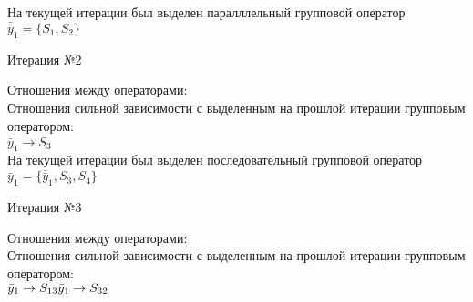 \documentclass[a4paper,14pt]{article}
\begin{document}
%
На текущей итерации был выделен паралллельный групповой оператор $\bar{\bar{y}}_{1} = \{S_{1}, S_{2}\}$
\begin{center} Итерация №2 \end{center}
Отношения между операторами: \\
Отношения сильной зависимости с выделенным на прошлой итерации групповым оператором: \\ \newline
\begin{math}
    \bar{\bar{y}}_{1} \rightarrow S_{3}
\end{math}\\ \newline
%
На текущей итерации был выделен последовательный групповой оператор $\bar{y}_{1} = \{\bar{\bar{y}}_{1}, S_{3}, S_{4}\}$
\begin{center} Итерация №3 \end{center}
Отношения между операторами: \\
Отношения сильной зависимости с выделенным на прошлой итерации групповым оператором: \\ \newline
\begin{math}
    \bar{y}_{1} \rightarrow S_{13} \\ 
\bar{y}_{1} \rightarrow S_{32}
\end{math} \\ \\ \\ 
%
\end{document}
